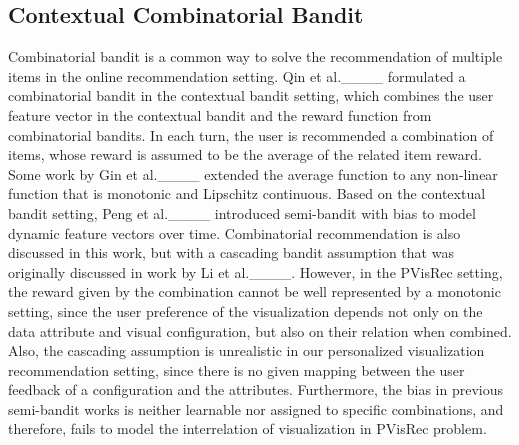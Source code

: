 \subsection{Contextual Combinatorial Bandit}
Combinatorial bandit is a common way to solve the recommendation of multiple items in the online recommendation setting.
Qin et al.____ formulated a combinatorial bandit in the contextual bandit setting, which combines the user feature vector in the contextual bandit and the reward function from combinatorial bandits. 
In each turn, the user is recommended a combination of items, whose reward is assumed to be the average of the related item reward. 
Some work by Gin et al.____ extended the average function to any non-linear function that is monotonic and Lipschitz continuous. Based on the contextual bandit setting, Peng et al.____ introduced semi-bandit with bias to model dynamic feature vectors over time. 
Combinatorial recommendation is also discussed in this work, but with a cascading bandit assumption that was originally discussed in work by Li et al.____. 
However, in the PVisRec setting, the reward given by the combination cannot be well represented by a monotonic setting, since the user preference of the visualization depends not only on the data attribute and visual configuration, but also on their relation when combined. Also, the cascading assumption is unrealistic in our personalized visualization recommendation setting, since there is no given mapping between the user feedback of a configuration and the attributes. Furthermore, the bias in previous semi-bandit works is neither learnable nor assigned to specific combinations, and therefore, fails to model the interrelation of visualization in PVisRec problem. 



